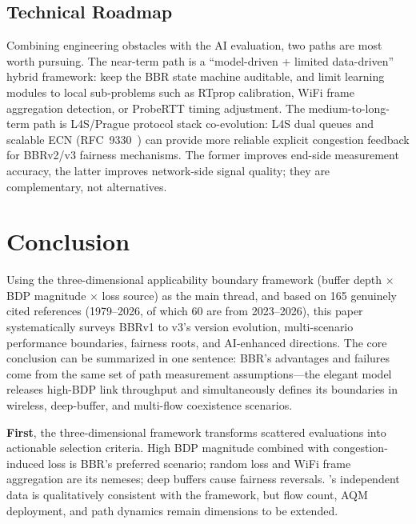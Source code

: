 \documentclass[a4paper,fleqn]{cas-sc}
\begin{document}
\subsection{Technical Roadmap}
\label{sec:ai_roadmap}

Combining engineering obstacles with the AI evaluation, two paths are most worth
pursuing. The near-term path is a ``model-driven + limited data-driven'' hybrid
framework: keep the BBR state machine auditable, and limit learning modules to
local sub-problems such as RTprop calibration, WiFi frame aggregation detection,
or ProbeRTT timing adjustment. The medium-to-long-term path is L4S/Prague
protocol stack co-evolution: L4S dual queues and scalable ECN
(RFC~9330~\citep{rfc9330}) can provide more reliable explicit congestion feedback
for BBRv2/v3 fairness mechanisms. The former improves end-side measurement
accuracy, the latter improves network-side signal quality; they are complementary,
not alternatives.

\section{Conclusion}
\label{sec:conclusion}

Using the three-dimensional applicability boundary framework (buffer depth
$\times$ BDP magnitude $\times$ loss source) as the main thread, and based on
165 genuinely cited references (1979--2026, of which 60 are from 2023--2026),
this paper systematically surveys BBRv1 to v3's version evolution, multi-scenario
performance boundaries, fairness roots, and AI-enhanced directions. The core
conclusion can be summarized in one sentence: BBR's advantages and failures come
from the same set of path measurement assumptions---the elegant model releases
high-BDP link throughput and simultaneously defines its boundaries in wireless,
deep-buffer, and multi-flow coexistence scenarios.

\textbf{First}, the three-dimensional framework transforms scattered evaluations
into actionable selection criteria. High BDP magnitude combined with
congestion-induced loss is BBR's preferred scenario; random loss and WiFi frame
aggregation are its nemeses; deep buffers cause fairness reversals.
\citet{scholz2018deeper}'s independent data is qualitatively consistent with the
framework, but flow count, AQM deployment, and path dynamics remain dimensions to
be extended.
\end{document}
